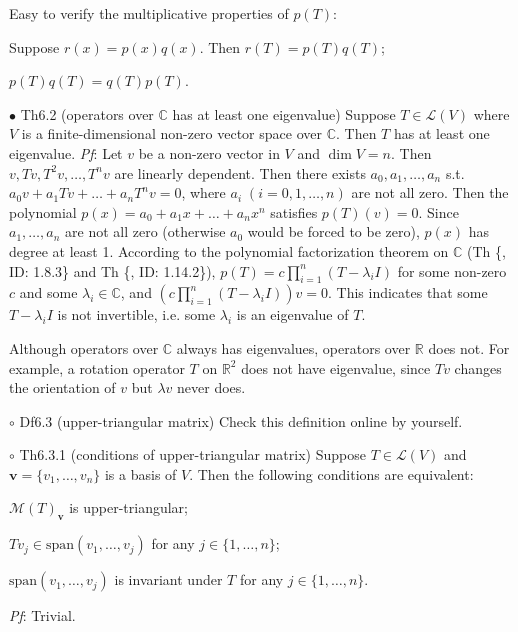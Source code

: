 \documentclass{article}
\begin{document}
\begin{Rmk}{}
    \textcolor{Th}{Easy to verify the multiplicative properties of $p(T)$:}
    \textcolor{Th}{
    \begin{compactitem}
        \item Suppose $r(x) = p(x)q(x)$. Then $r(T) = p(T)q(T)$;
        \item $p(T)q(T) = q(T)p(T)$.
    \end{compactitem}
    }
\end{Rmk}

\begin{Th}{$\bullet$ Th6.2 (operators over $\mathbb{C}$ has at least one eigenvalue)}
    Suppose $T\in\mathcal{L}(V)$ where $V$ is a finite-dimensional non-zero vector space over $\mathbb{C}$. Then $T$ has at least one eigenvalue.
    \tcblower
    \textit{Pf}: Let $v$ be a non-zero vector in $V$ and $\dim V=n$. Then $v, Tv, T^2v, \dots, T^nv$ are linearly dependent. Then there exists $a_0, a_1, \dots, a_n$ s.t. $a_0v+a_1Tv+\dots+a_nT^nv=0$, where $a_i \;(i=0,1,\dots, n)$ are not all zero. Then the polynomial $p(x) = a_0+a_1x+\dots+a_nx^n$ satisfies $p(T)(v) = 0$. Since $a_1, \dots, a_n$ are not all zero (otherwise $a_0$ would be forced to be zero), $p(x)$ has degree at least 1. According to the polynomial factorization theorem on $\mathbb{C}$ (Th \{, ID: 1.8.3\} and Th \{, ID: 1.14.2\}), $p(T) = c\prod_{i=1}^n (T-\lambda_iI)$ for some non-zero $c$ and some $\lambda_i\in\mathbb{C}$, and $\left(c\prod_{i=1}^n (T-\lambda_iI)\right)v = 0$. This indicates that some $T-\lambda_i I$ is not invertible, i.e. some $\lambda_i$ is an eigenvalue of $T$.
\end{Th}

\begin{Rmk}{}
    \textcolor{Th}{Although operators over $\mathbb{C}$ always has eigenvalues, operators over $\mathbb{R}$ does not}. For example, a rotation operator $T$ on $\mathbb{R}^2$ does not have eigenvalue, since $Tv$ changes the orientation of $v$ but $\lambda v$ never does.
\end{Rmk}

\begin{Df}{$\circ$ Df6.3 (upper-triangular matrix)}
    Check this definition online by yourself.
\end{Df}

\begin{Th}{$\circ$ Th6.3.1 (conditions of upper-triangular matrix)}
    Suppose $T\in\mathcal{L}(V)$ and $\pmb{v} = \{v_1, \dots, v_n\}$ is a basis of $V$. Then the following conditions are equivalent:
    \begin{compactenum}
        \item $\mathcal{M}(T)_{\pmb{v}}$ is upper-triangular;
        \item $Tv_j\in \text{span}(v_1, \dots, v_j)$ for any $j\in\{1, \dots, n\}$;
        \item $\text{span}(v_1, \dots, v_j)$ is invariant under $T$ for any $j\in\{1, \dots, n\}$.
    \end{compactenum}
    \tcblower
    \textit{Pf}: Trivial.
\end{Th}
\end{document}
